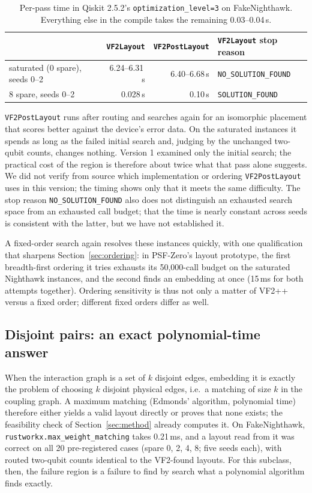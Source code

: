\documentclass[11pt]{article}
\begin{document}
\begin{table}[h]
\centering
\begin{tabular}{lrrl}
\toprule
& \texttt{VF2Layout} & \texttt{VF2PostLayout} & \texttt{VF2Layout} stop reason \\
\midrule
saturated (0 spare), seeds 0--2 & 6.24--6.31\,s & 6.40--6.68\,s & \texttt{NO\_SOLUTION\_FOUND} \\
8 spare, seeds 0--2 & 0.028\,s & 0.10\,s & \texttt{SOLUTION\_FOUND} \\
\bottomrule
\end{tabular}
\caption{Per-pass time in Qiskit 2.5.2's \texttt{optimization\_level=3}
on FakeNighthawk. Everything else in the compile takes the remaining 0.03--0.04\,s.}
\label{tab:twohalves}
\end{table}

\texttt{VF2PostLayout} runs after routing and searches again for an
isomorphic placement that scores better against the device's error data.
On the saturated instances it spends as long as the failed initial
search and, judging by the unchanged two-qubit counts, changes nothing.
Version 1 examined only the initial search; the practical cost of the
region is therefore about twice what that pass alone suggests. We did not
verify from source which implementation or ordering
\texttt{VF2PostLayout} uses in this version; the timing shows only that
it meets the same difficulty. The stop reason
\texttt{NO\_SOLUTION\_FOUND} also does not distinguish an exhausted search
space from an exhausted call budget; that the time is nearly constant
across seeds is consistent with the latter, but we have not established
it.

A fixed-order search again resolves these instances quickly, with one
qualification that sharpens Section~\ref{sec:ordering}: in PSF-Zero's
layout prototype, the first breadth-first ordering it tries exhausts its
50{,}000-call budget on the saturated Nighthawk instances, and the
second finds an embedding at once (15\,ms for both attempts together).
Ordering sensitivity is thus not only a matter of VF2++ versus a fixed
order; different fixed orders differ as well.

\subsection{Disjoint pairs: an exact polynomial-time answer}

When the interaction graph is a set of $k$ disjoint edges, embedding it
is exactly the problem of choosing $k$ disjoint physical edges, i.e.\ a
matching of size $k$ in the coupling graph. A maximum matching (Edmonds'
algorithm, polynomial time) therefore either yields a valid layout
directly or proves that none exists; the feasibility check of
Section~\ref{sec:method} already computes it. On FakeNighthawk,
\texttt{rustworkx.max\_weight\_matching} takes 0.21\,ms, and a layout read
from it was correct on all 20 pre-registered cases (spare 0, 2, 4, 8;
five seeds each), with routed two-qubit counts identical to the
VF2-found layouts. For this subclass, then, the failure region is a
failure to find by search what a polynomial algorithm finds exactly.
\end{document}
